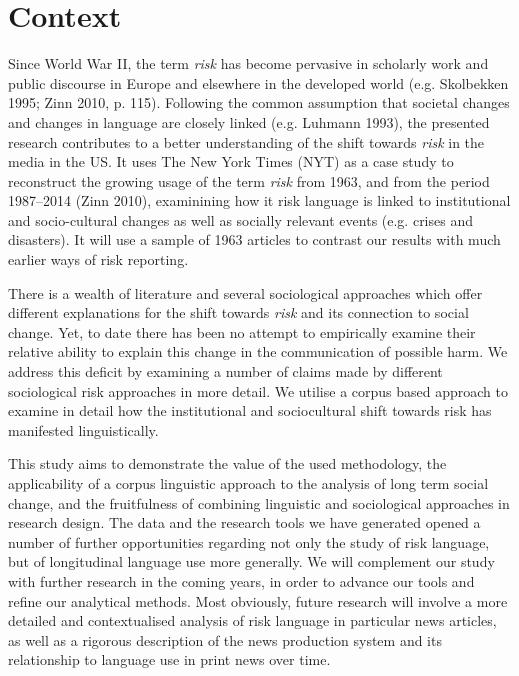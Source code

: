 
\chapter{Context}

Since World War II, the term \emph{risk} has become pervasive in scholarly work and public discourse in Europe and elsewhere in the developed world (e.g. Skolbekken 1995; Zinn 2010, p. 115). Following the common assumption that societal changes and changes in language are closely linked (e.g. Luhmann 1993), the presented research contributes to a better understanding of the shift towards \emph{risk} in the media in the US. It uses The New York Times (NYT) as a case study to reconstruct the growing usage of the term \emph{risk} from 1963, and from the period 1987--2014 (Zinn 2010), examinining how it risk language is linked to institutional and socio-cultural changes as well as socially relevant events (e.g. crises and disasters). It will use a sample of 1963 articles to contrast our results with much earlier ways of risk reporting. 

There is a wealth of literature and several sociological approaches which offer different explanations for the shift towards \emph{risk} and its connection to social change. Yet, to date there has been no attempt to empirically examine their relative ability to explain this change in the communication of possible harm. We address this deficit by examining a number of claims made by different sociological risk approaches in more detail. We utilise a corpus based approach to examine in detail how the institutional and sociocultural shift towards risk has manifested linguistically.

This study aims to demonstrate the value of the used methodology, the applicability of a corpus linguistic approach to the analysis of long term social change, and the fruitfulness of combining linguistic and sociological approaches in research design. The data and the research tools we have generated opened a number of further opportunities regarding not only the study of risk language, but of longitudinal language use more generally. We will complement our study with further research in the coming years, in order to advance our tools and refine our analytical methods. Most obviously, future research will involve a more detailed and contextualised analysis of risk language in particular news articles, as well as a rigorous description of the news production system and its relationship to language use in print news over time.


